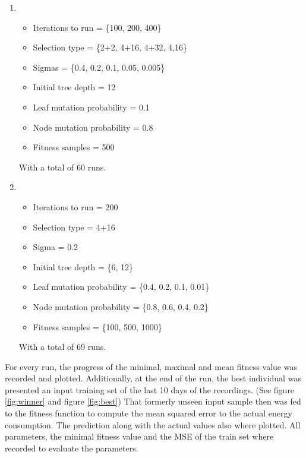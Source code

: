 \documentclass[conference]{IEEEtran}
\begin{document}
\begin{enumerate}
\item 
\begin{itemize}
\item Iterations to run = \{100, 200, 400\}
\item Selection type = \{2+2,  4+16, 4+32, 4,16\}
\item Sigmas = \{0.4, 0.2, 0.1, 0.05, 0.005\}
\item Initial tree depth = 12
\item Leaf mutation probability = 0.1
\item Node mutation probability = 0.8
\item Fitness samples = 500
\end{itemize}

With a total of 60 runs.\\

\item
\begin{itemize}
\item Iterations to run = 200
\item Selection type = 4+16
\item Sigma = 0.2
\item Initial tree depth = \{6, 12\}
\item Leaf mutation probability = \{0.4, 0.2, 0.1, 0.01\}
\item Node mutation probability = \{0.8, 0.6, 0.4, 0.2\}
\item Fitness samples = \{100, 500, 1000\}
\end{itemize}
With a total of 69 runs.\\
\end{enumerate}
For every run, the progress of the minimal, maximal and mean fitness value was recorded and plotted. Additionally, at the end of the run, the best individual was presented an input training set of the last 10 days of the recordings. (See figure \ref{fig:winner} and figure \ref{fig:best}) That formerly unseen input sample then was fed to the fitness function to compute the mean squared error to the actual energy consumption. The prediction along with the actual values also where plotted. All parameters, the minimal fitness value and the MSE of the train set where recorded to evaluate the parameters.
\end{document}
